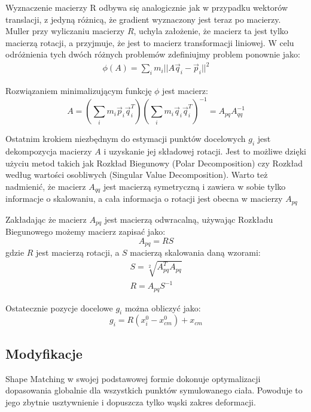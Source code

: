 Wyznaczenie macierzy R odbywa się analogicznie jak w przypadku wektorów
translacji, z jedyną różnicą, że gradient wyznaczony jest teraz po macierzy.
Muller \cite{shape} przy wyliczaniu macierzy $R$, uchyla założenie, że macierz ta
jest tylko macierzą rotacji, a przyjmuje, że jest to macierz transformacji
liniowej. W celu odróżnienia tych dwóch różnych problemów zdefiniujmy problem
ponownie jako:
\begin{eqnarray}
\phi(A) = \sum_i m_i || A \vec{q}_i - \vec{p}_i||^2
\end{eqnarray}

Rozwiązaniem minimalizującym funkcję $\phi$ jest macierz:\cite{shape}
\begin{equation}
\label{A-final}
A = (\sum_i m_i \vec{p}_i \vec{q}^T_i)(\sum_i m_i \vec{q}_i \vec{q}^T_i)^{-1}
= A_{pq} A_{qq}^{-1}
\end{equation}

Ostatnim krokiem niezbędnym do estymacji punktów docelowych $g_i$ jest
dekompozycja macierzy $A$ i uzyskanie jej składowej rotacji. Jest to możliwe dzięki
użyciu metod takich jak Rozkład Biegunowy (Polar Decomposition) czy Rozkład
według wartości osobliwych (Singular Value Decomposition). Warto też nadmienić,
	że macierz $A_{qq}$ jest macierzą symetryczną i zawiera w sobie tylko
	informacje o skalowaniu, a cała informacja o rotacji jest obecna w
	macierzy $A_{pq}$

Zakładając że macierz $A_{pq}$ jest macierzą odwracalną, używając Rozkładu
Biegunowego możemy macierz zapisać jako:
\begin{equation}
\label{polar}
A_{pq} = RS
\end{equation}
gdzie $R$ jest macierzą rotacji, a $S$ macierzą skalowania daną wzorami:
\begin{eqnarray}
S = \sqrt[2]{A^T_{pq} A_{pq}}\\
R = A_{pq} S^{-1}
\end{eqnarray}

Ostatecznie pozycje docelowe $g_i$ można obliczyć jako:
\begin{equation}
g_i = R(x_i^0 - x^0_{cm}) + x_{cm}
\end{equation}

\subsection{Modyfikacje}
\label{ssec:region}
Shape Matching w swojej podstawowej formie dokonuje optymalizacji dopasowania
globalnie dla wszystkich punktów symulowanego ciała. Powoduje to jego zbytnie
usztywnienie i dopuszcza tylko wąski zakres deformacji.


